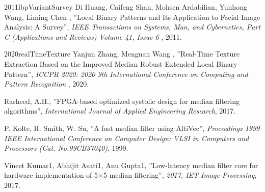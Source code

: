 \documentclass[a4paper,12pt,oneside]{book}%
\begin{document}
\begin{thebibliography}{xx}
	
	{2011}{lbpVariantSurvey}
	Di Huang, Caifeng Shan, Mohsen Ardabilian, Yunhong Wang, Liming Chen
	, ''Local Binary Patterns and Its Application to Facial Image Analysis: A Survey'', {\em  IEEE Transactions on Systems, Man, and Cybernetics, Part C (Applications and Reviews) Volume 41, Issue 6 }, 2011.
	
	
	{2020}{realTimeTexture}
	Yanjun Zhang, Mengnan Wang
	, ''Real-Time Texture Extraction Based on the Improved Median Robust Extended Local Binary Pattern'', {\em  ICCPR 2020: 2020 9th International Conference on Computing and Pattern Recognition }, 2020.
	
	 	
	Rasheed, A.H., ''FPGA-based optimized systolic design for median filtering algorithms'', {\em International Journal of Applied Engineering Research}, 2017.
	
	P. Kolte, R. Smith,  W. Su, ''A fast median filter using AltiVec'', {\em  Proceedings 1999 IEEE International Conference on Computer Design: VLSI in Computers and Processors (Cat. No.99CB37040)}, 1999.
	
	Vineet Kumar1, Abhijit Asati1, Anu Gupta1, ''Low-latency median filter core for hardware implementation of 5×5 median filtering'', {\em  2017, IET Image Processing}, 2017.
	
	
\end{thebibliography}
\end{document}
